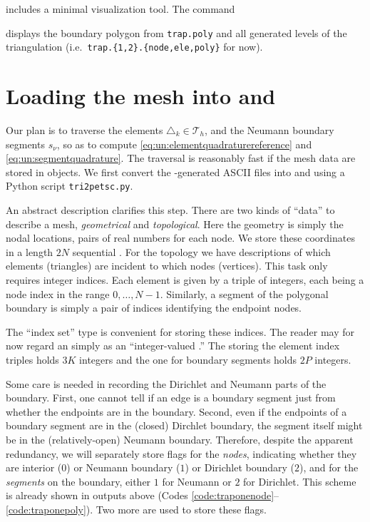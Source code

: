 \Triangle includes a minimal visualization tool.  The command
displays the boundary polygon from \texttt{trap.poly} and all generated levels of the triangulation (i.e.~\texttt{trap.\{1,2\}.\{node,ele,poly\}} for now).


\section{Loading the mesh into \PETSc \pVecs and \pISs}

Our plan is to traverse the elements $\triangle_k \in {}_h$, and the Neumann boundary segments $s_\nu$, so as to compute \eqref{eq:un:elementquadraturereference} and \eqref{eq:un:segmentquadrature}.  The traversal is reasonably fast if the mesh data are stored in \PETSc objects.  We first convert the \Triangle-generated ASCII files into \pVecs and \pISs using a Python script \texttt{tri2petsc.py}.

An abstract description clarifies this step.  There are two kinds of ``data'' to describe a mesh, \emph{geometrical} and \emph{topological}.  Here the geometry is simply the nodal locations, pairs of real numbers for each node.  We store these coordinates in a length $2N$ sequential \pVec.  For the topology we have descriptions of which elements (triangles) are incident to which nodes (vertices).  This task only requires integer indices.  Each element is given by a triple of integers, each being a node index in the range $0,\dots,N-1$.  Similarly, a segment of the polygonal boundary is simply a pair of indices identifying the endpoint nodes.

The \PETSc \pIS ``index set'' type is convenient for storing these indices.  The reader may for now regard an \pIS simply as an ``integer-valued \pVec.''  The \pIS storing the element index triples holds $3K$ integers and the one for boundary segments holds $2P$ integers.

Some care is needed in recording the Dirichlet and Neumann parts of the boundary.  First, one cannot tell if an edge is a boundary segment just from whether the endpoints are in the boundary.  Second, even if the endpoints of a boundary segment are in the (closed) Dirchlet boundary, the segment itself might be in the (relatively-open) Neumann boundary.  Therefore, despite the apparent redundancy, we will separately store flags for the \emph{nodes}, indicating whether they are interior ($0$) or Neumann boundary ($1$) or Dirichlet boundary ($2$), and for the \emph{segments} on the boundary, either $1$ for Neumann or $2$ for Dirichlet.  This scheme is already shown in \Triangle outputs above (Codes \ref{code:traponenode}--\ref{code:traponepoly}).  Two more \pISs are used to store these flags.

